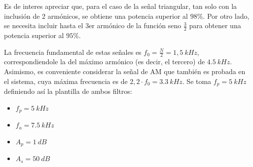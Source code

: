 Es de interes apreciar que, para el caso de la señal triangular, tan solo con la inclusión de 2 armónicos, se obtiene una potencia superior al $98\%$. Por otro lado, se necesita incluir hasta el 3er armónico de la función  seno $\frac{3}{2}$ para obtener una potencia superior al $95\%$.

La frecuencia fundamental de estas señales es $f_0 = \frac{N}{2} = 1,5 \ kHz$, correspondiendole la del máximo armónico (es decir, el tercero) de $4.5 \ kHz$. Asimismo, es conveniente considerar la señal de AM que también es probada en el sistema, cuya máxima frecuencia es de $2,2 \cdot f_0 = 3.3 \ kHz$. Se toma $f_p= 5 \ kHz$  definiendo así la plantilla de ambos filtros:
\begin{multicols}{2}
\begin{itemize}
	\item $f_p = 5 \ kHz$
	\item $f_a = 7.5 \ kHz$
	\item $A_p = 1 \ dB$
	\item $A_s = 50 \ dB$
\end{itemize}
\end{multicols}

